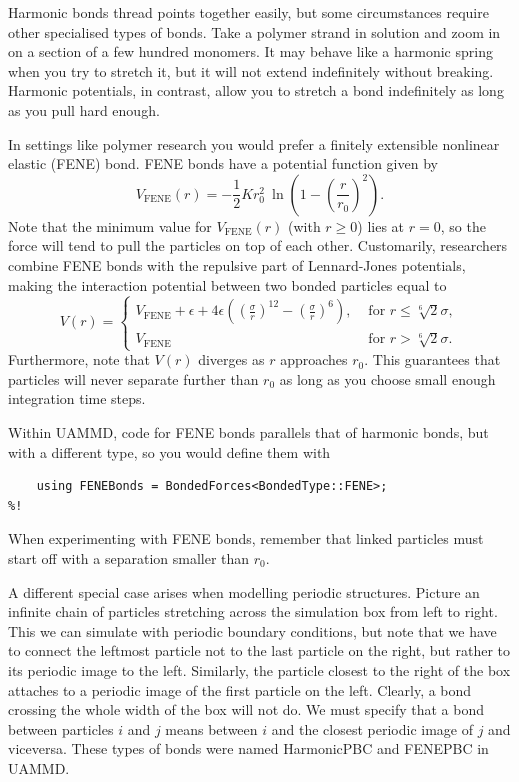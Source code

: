Harmonic bonds thread points together easily, but some circumstances require
other specialised types of bonds. Take a polymer strand in solution and zoom in
on a section of a few hundred monomers. It may behave like a harmonic spring
when you try to stretch it, but it will not extend indefinitely without
breaking. Harmonic potentials, in contrast, allow you to stretch a bond
indefinitely as long as you pull hard enough.

In settings like polymer research you would prefer a finitely extensible
nonlinear  elastic (FENE) bond. FENE bonds have a potential function given by
\begin{equation*}
  V_\text{FENE}(r) = -\frac{1}{2} K r_0^2\ 
                \ln\left(1 - \left(\frac{r}{r_0}\right)^2\right).
\end{equation*}
Note that the minimum value for $V_\text{FENE}(r)$ (with $r \geq 0$) lies at $r
= 0$, so the force will tend to pull the particles on top of each other.
Customarily, researchers combine FENE bonds with the repulsive part of
Lennard-Jones potentials, making the interaction potential between two bonded
particles equal to
\begin{equation*}
  V(r) =
    \begin{cases}
         V_\text{FENE}
         + \epsilon
         + 4\epsilon\left(\left(\frac{\sigma}{r}\right)^{12}
                        - \left(\frac{\sigma}{r}\right)^6\right),
         & \text{ for } r \leq \sqrt[6]{2} \sigma, \\
         V_\text{FENE}
         & \text{ for } r > \sqrt[6]{2} \sigma.
    \end{cases}
\end{equation*}
Furthermore, note that $V(r)$ diverges as $r$ approaches $r_0$. This guarantees
that particles will never separate further than $r_0$ as long as you choose
small enough integration time steps.

Within UAMMD, code for FENE bonds parallels that of harmonic bonds, but with a
different type, so you would define them with
\begin{lstlisting}
    using FENEBonds = BondedForces<BondedType::FENE>;
%!
\end{lstlisting}
When experimenting with FENE bonds, remember that linked particles must start
off with a separation smaller than $r_0$.

A different special case arises when modelling periodic structures. Picture an
infinite chain of particles stretching across the simulation box from left to
right. This we can simulate with periodic boundary conditions, but note that we
have to connect the leftmost particle not to the last particle on the right, but
rather to its periodic image to the left. Similarly, the particle closest to the
right of the box attaches to a periodic image of the first particle on the left.
Clearly, a bond crossing the whole width of the box will not do. We must specify
that a bond between particles $i$ and $j$ means between $i$ and the closest
periodic image of $j$ and viceversa. These types of bonds were named HarmonicPBC
and FENEPBC in UAMMD.

